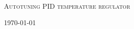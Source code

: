 \begin{titlepage}
\begin{center}

\textsc{\Huge Autotuning PID temperature regulator}\\[1.5cm]

\vfill

\today

\end{center}
\end{titlepage}
